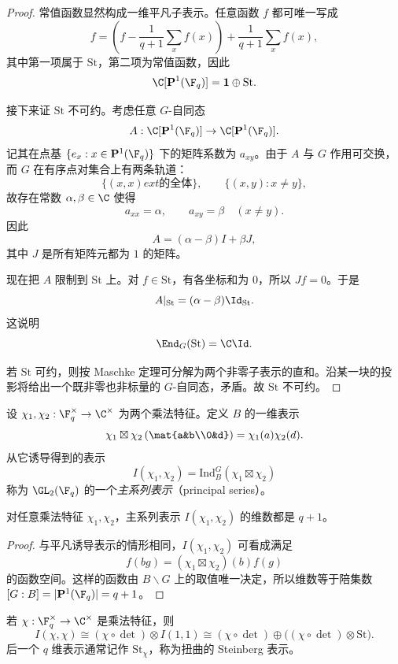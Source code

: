 \begin{proof}
常值函数显然构成一维平凡子表示。任意函数 $f$ 都可唯一写成
\[
f=\left(f-\frac{1}{q+1}\sum_x f(x)\right)+\frac{1}{q+1}\sum_x f(x),
\]
其中第一项属于 $\mathrm{St}$，第二项为常值函数，因此
\[
\C[\mathbf{P}^1(\F_q)]=\mathbf{1}\oplus \mathrm{St}.
\]

接下来证 $\mathrm{St}$ 不可约。考虑任意 $G$-自同态
\[
A:\C[\mathbf{P}^1(\F_q)]\to \C[\mathbf{P}^1(\F_q)].
\]
记其在点基 $\{e_x:x\in \mathbf{P}^1(\F_q)\}$ 下的矩阵系数为 $a_{xy}$。由于 $A$ 与 $G$ 作用可交换，而 $G$ 在有序点对集合上有两条轨道：
\[
\{(x,x)	ext{ 的全体}\},\qquad \{(x,y):x\neq y\},
\]
故存在常数 $\alpha,\beta\in \C$ 使得
\[
a_{xx}=\alpha,\qquad a_{xy}=\beta\quad (x\neq y).
\]
因此
\[
A=(\alpha-\beta)I+\beta J,
\]
其中 $J$ 是所有矩阵元都为 $1$ 的矩阵。

现在把 $A$ 限制到 $\mathrm{St}$ 上。对 $f\in \mathrm{St}$，有各坐标和为 $0$，所以 $Jf=0$。于是
\[
A|_{\mathrm{St}}=(\alpha-\beta)\Id_{\mathrm{St}}.
\]
这说明
\[
\End_G(\mathrm{St})=\C\Id.
\]

若 $\mathrm{St}$ 可约，则按 Maschke 定理可分解为两个非零子表示的直和。沿某一块的投影将给出一个既非零也非标量的 $G$-自同态，矛盾。故 $\mathrm{St}$ 不可约。
\end{proof}

\begin{definition}
设 $\chi_1,\chi_2:\F_q^{\times}\to \C^{\times}$ 为两个乘法特征。定义 $B$ 的一维表示
\[
\chi_1\boxtimes \chi_2\left(\mat{a&b\\0&d}\right)=\chi_1(a)\chi_2(d).
\]
从它诱导得到的表示
\[
I(\chi_1,\chi_2)=\mathrm{Ind}_B^G(\chi_1\boxtimes \chi_2)
\]
称为 $\GL_2(\F_q)$ 的一个\emph{主系列表示}（principal series）。
\end{definition}

\begin{proposition}
对任意乘法特征 $\chi_1,\chi_2$，主系列表示 $I(\chi_1,\chi_2)$ 的维数都是 $q+1$。
\end{proposition}

\begin{proof}
与平凡诱导表示的情形相同，$I(\chi_1,\chi_2)$ 可看成满足
\[
 f(bg)=(\chi_1\boxtimes\chi_2)(b)f(g)
\]
的函数空间。这样的函数由 $B\backslash G$ 上的取值唯一决定，所以维数等于陪集数 $[G:B]=|\mathbf{P}^1(\F_q)|=q+1$。
\end{proof}

\begin{proposition}
若 $\chi:\F_q^{\times}\to \C^{\times}$ 是乘法特征，则
\[
I(\chi,\chi)\cong (\chi\circ \det)\otimes I(1,1)
\cong (\chi\circ \det)\oplus \bigl((\chi\circ \det)\otimes \mathrm{St}\bigr).
\]
后一个 $q$ 维表示通常记作 $\mathrm{St}_\chi$，称为扭曲的 Steinberg 表示。
\end{proposition}

